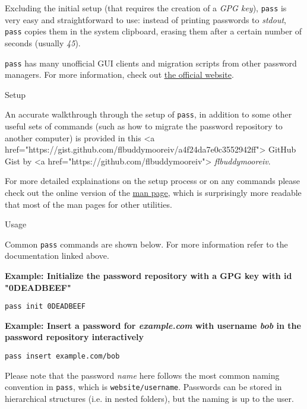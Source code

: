 \documentclass[hidelinks,12pt,a4paper,numbers=enddot]{scrartcl}
\begin{document}
Excluding the initial setup (that requires the creation of a \emph{GPG key}),
\texttt{pass} is very easy and straightforward to use: instead of
printing passwords to \emph{stdout}, \texttt{pass} copies them in the
system clipboard, erasing them after a certain number of seconds (usually
\emph{45}).




\texttt{pass} has many unofficial GUI clients and migration scripts from
other password managers. For more information, check out
\underline{\href{https://www.passwordstore.org/\#other}{the official website}}.


Setup



An accurate walkthrough through the setup of \texttt{pass}, in addition
to some other useful sets of commands (such as how to migrate the password
repository to another computer) is provided
in this <a href="https://gist.github.com/flbuddymooreiv/a4f24da7e0c3552942ff">
GitHub Gist by <a href="https://github.com/flbuddymooreiv">
\emph{flbuddymooreiv}.




For more detailed explainations on the setup process or on any commands
please check out the online version of the
\underline{\href{https://git.zx2c4.com/password-store/about/}{man page}}, which is
surprisingly more readable that most of the man pages for other utilities.


Usage



Common \texttt{pass} commands are shown below. For more information refer
to the documentation linked above.



\textbf{
Example: Initialize the password repository with a GPG key with id "0DEADBEEF"
}

\begin{verbatim}
pass init 0DEADBEEF
\end{verbatim}


\textbf{
Example: Insert a password for \emph{example.com} with username \emph{bob} in
  the password repository interactively
}

\begin{verbatim}
pass insert example.com/bob
\end{verbatim}



Please note that the password \emph{name} here follows the most common
naming convention in \texttt{pass}, which is
\texttt{{website}/{username}}. Passwords can be stored in
hierarchical structures (i.e. in nested folders), but the naming is up to the
user.
\end{document}
